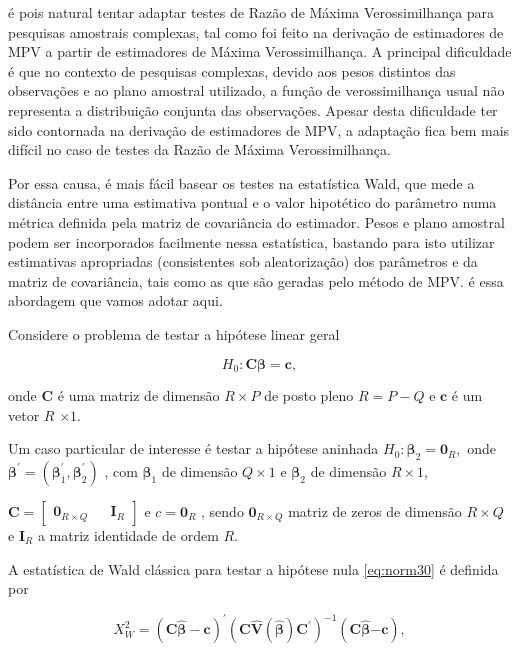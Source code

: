 \documentclass[]{book}
\numberwithin{example}{chapter}
\numberwithin{remark}{chapter}
\numberwithin{definition}{chapter}
\begin{document}
é pois natural tentar adaptar testes de Razão de Máxima Verossimilhança
para pesquisas amostrais complexas, tal como foi feito na derivação de
estimadores de MPV a partir de estimadores de Máxima Verossimilhança. A
principal dificuldade é que no contexto de pesquisas complexas, devido
aos pesos distintos das observações e ao plano amostral utilizado, a
função de verossimilhança usual não representa a distribuição conjunta
das observações. Apesar desta dificuldade ter sido contornada na
derivação de estimadores de MPV, a adaptação fica bem mais difícil no
caso de testes da Razão de Máxima Verossimilhança.

Por essa causa, é mais fácil basear os testes na estatística Wald, que
mede a distância entre uma estimativa pontual e o valor hipotético do
parâmetro numa métrica definida pela matriz de covariância do estimador.
Pesos e plano amostral podem ser incorporados facilmente nessa
estatística, bastando para isto utilizar estimativas apropriadas
(consistentes sob aleatorização) dos parâmetros e da matriz de
covariância, tais como as que são geradas pelo método de MPV. é essa
abordagem que vamos adotar aqui.

Considere o problema de testar a hipótese linear geral

\begin{equation}
H_{0}:\mathbf{C\beta }=\mathbf{c},  \label{eq:norm30}
\end{equation}

onde \(\mathbf{C}\) é uma matriz de dimensão \(R\times P\) de posto
pleno \(R=P-Q\) e \(\mathbf{c}\) é um vetor \(R\) \(\times 1.\)

Um caso particular de interesse é testar a hipótese aninhada
\(H_{0}:\mathbf{\beta }_{2}=\mathbf{0}_{R}\mathbf{,}\) onde
\(\mathbf{\beta }^{\prime}=\left( \mathbf{\beta }_{1}^{\prime },\mathbf{\beta }_{2}^{\prime }\right)\)
, com \(\mathbf{\beta }_{1}\) de dimensão \(Q\times 1\) e
\(\mathbf{\beta}_{2}\) de dimensão \(R\times 1\),

\(\mathbf{C}= \left[\begin{array}{lll}\mathbf{0}_{R\times Q} & & \mathbf{I}_{R}\end{array}\right]\)
e \(c=\mathbf{0}_{R}\) , sendo \(\mathbf{0}_{R\times Q}\) matriz de
zeros de dimensão \(R\times Q\) e \(\mathbf{I}_{R}\) a matriz identidade
de ordem \(R\).

A estatística de Wald clássica para testar a hipótese nula
\eqref{eq:norm30} é definida por

\begin{equation}
X_{W}^{2}=\left( \mathbf{C}\widehat{\mathbf{\beta }}-\mathbf{c}\right)
^{\prime }\left( \mathbf{C}\widehat{\mathbf{V}}\left( \mathbf{\hat{\beta}}
\right) \mathbf{C}^{\prime }\right) ^{-1}\left( \mathbf{C}\widehat{\mathbf{
\beta }}\mathbf{-c}\right),  \label{eq:norm31}
\end{equation}
\end{document}

